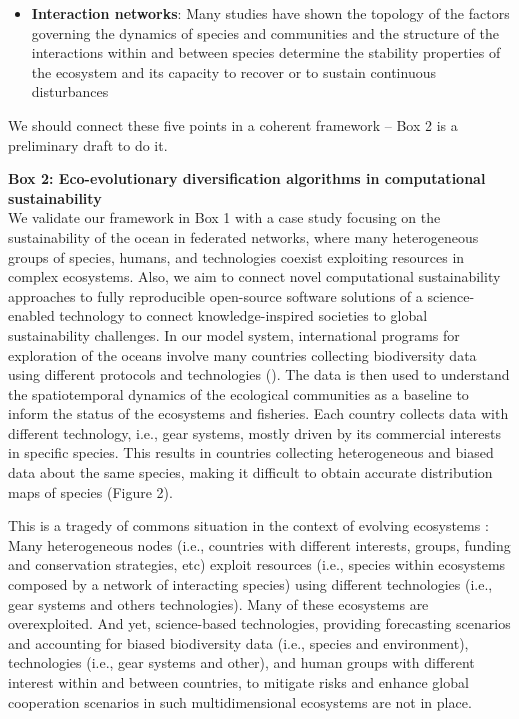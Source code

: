 \documentclass[12pt,a4paper]{article}
\begin{document}
{\begin{tcolorbox}[colback=green!5!white,colframe=green!75!black]
\begin{itemize}
\item {\bf Interaction networks}: Many studies have shown the topology of the factors governing the dynamics of species and communities and the structure of the interactions within and between species determine the stability properties of the ecosystem and its capacity to recover or to sustain continuous disturbances
\end{itemize}

We should connect these five points in a coherent framework -- Box 2 is a preliminary draft to do it.
\end{tcolorbox}}


{\small \begin{tcolorbox}[colback=green!5!white,colframe=green!75!black]
  \textbf{Box 2: Eco-evolutionary diversification algorithms in computational sustainability}\\
We validate our framework in Box 1 with a case study focusing on the sustainability of the ocean in federated networks, where many heterogeneous groups of species, humans, and technologies coexist exploiting resources in complex ecosystems.  Also, we aim to connect novel computational sustainability approaches to fully reproducible open-source software solutions of a science-enabled technology to connect knowledge-inspired societies to global sustainability challenges. In our model system, international programs for exploration of the oceans involve many countries collecting biodiversity data using different protocols and technologies (\cite{ices}). The data is then used to understand the spatiotemporal dynamics of the ecological communities as a baseline to inform the status of the ecosystems and fisheries. Each country collects data with different technology, i.e., gear systems, mostly driven by its commercial interests in specific species. This results in countries collecting heterogeneous and biased data about the same species, making it difficult to obtain accurate distribution maps of species (Figure 2). 

This is a tragedy of commons situation \cite{Hardin1968,Ostrom1990,Ecoffet2020} in the context of evolving ecosystems \cite{Rankinetal2007}: Many heterogeneous nodes (i.e., countries with different interests, groups, funding and conservation strategies, etc) exploit resources (i.e., species within ecosystems composed by a network of interacting species) using different technologies (i.e., gear systems and others technologies). Many of these ecosystems are overexploited. And yet, science-based technologies, providing forecasting scenarios and accounting for biased biodiversity data (i.e., species and environment), technologies (i.e., gear systems and other), and human groups with different interest within and between countries, to mitigate risks and enhance global cooperation scenarios in such multidimensional ecosystems are not in place. 


\end{tcolorbox}}
\end{document}
